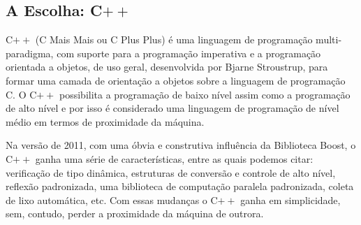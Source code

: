 \documentclass[a4paper,12pt]{report}
\begin{document}
\subsection{A Escolha: C$++$}
%
C$++$ (C Mais Mais ou C Plus Plus) é uma linguagem de programação multi-paradigma, com suporte para a programação imperativa e a programação 
orientada a objetos, de uso geral, desenvolvida por Bjarne Stroustrup, para formar uma camada de orientação a objetos sobre a linguagem de 
programação C. O C$++$ possibilita a programação de baixo nível assim como a programação de alto nível e por isso é considerado uma linguagem 
de programação de nível médio em termos de proximidade da máquina.
\par
Na versão de 2011, com uma óbvia e construtiva influência da Biblioteca Boost, o C$++$ ganha uma série de características, entre as quais podemos
citar: verificação de tipo dinâmica, estruturas de conversão e controle de alto nível, reflexão padronizada, uma biblioteca de computação paralela 
padronizada, coleta de lixo automática, etc. Com essas mudanças o C$++$ ganha em simplicidade, sem, contudo, perder a proximidade da máquina de outrora. 
%
%
\end{document}
